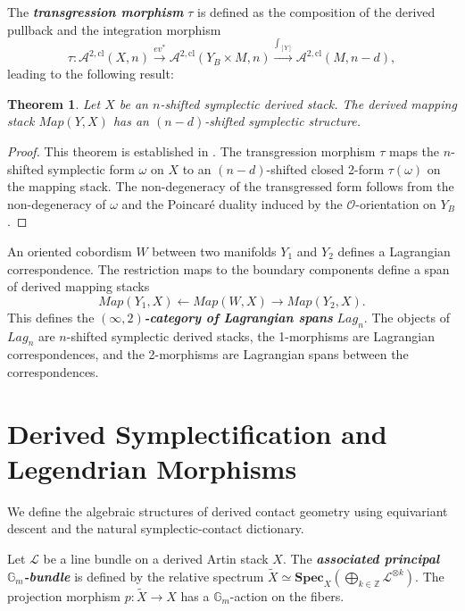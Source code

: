 \documentclass[reqno]{amsart}
\newcommand{\bfem}[1]{\textbf{\textit{#1}}}
\newcommand{\Gm}{\mathbb{G}_m}
\newcommand{\cO}{\mathcal{O}}
\newcommand{\cL}{\mathcal{L}}
\newtheorem{theorem}{Theorem}[section]
\begin{document}
The \bfem{transgression morphism} $\tau$ is defined as the composition of the derived pullback and the integration morphism
\[
    \tau \colon \mathcal{A}^{2, \mathrm{cl}}(X, n) \xrightarrow{ev^*} \mathcal{A}^{2, \mathrm{cl}}(Y_{B} \times M, n) \xrightarrow{\int_{[Y]}} \mathcal{A}^{2, \mathrm{cl}}(M, n-d),
\]leading to the following result:

\begin{theorem}\label{ptvv_a}
Let $X$ be an $n$-shifted symplectic derived stack. The derived mapping stack $Map(Y, X)$ has an $(n-d)$-shifted symplectic structure.
\end{theorem}
\begin{proof}
This theorem is established in \cite[Theorem 2.5]{PTVV}. The transgression morphism $\tau$ maps the $n$-shifted symplectic form $\omega$ on $X$ to an $(n-d)$-shifted closed 2-form $\tau(\omega)$ on the mapping stack. The non-degeneracy of the transgressed form follows from the non-degeneracy of $\omega$ and the Poincaré duality induced by the $\cO$-orientation on $Y_B$.
\end{proof}

An oriented cobordism $W$ between two manifolds $Y_{1}$ and $Y_{2}$ defines a Lagrangian correspondence. The restriction maps to the boundary components define a span of derived mapping stacks
\[
    Map(Y_{1}, X) \leftarrow Map(W, X) \rightarrow Map(Y_{2}, X).
\]
This defines the \bfem{$(\infty, 2)$-category of Lagrangian spans} $Lag_{n}$. The objects of $Lag_{n}$ are $n$-shifted symplectic derived stacks, the 1-morphisms are Lagrangian correspondences, and the 2-morphisms are Lagrangian spans between the correspondences.

\section{Derived Symplectification and Legendrian Morphisms}\label{sec:symplectification}

We define the algebraic structures of derived contact geometry using equivariant descent and the natural symplectic-contact dictionary. 

Let $\cL$ be a line bundle on a derived Artin stack $X$. The \bfem{associated principal $\Gm$-bundle} is defined by the relative spectrum $\widetilde{X} \simeq \mathbf{Spec}_{X}(\bigoplus_{k \in \mathbb{Z}} \cL^{\otimes k})$. The projection morphism $p \colon \widetilde{X} \to X$ has a $\Gm$-action on the fibers. 
\end{document}
